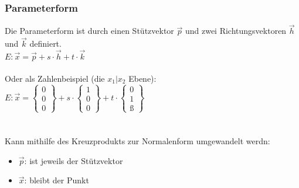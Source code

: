 
\subsubsection{Parameterform}
Die Parameterform ist durch einen Stützvektor $\vec{p}$ und zwei Richtungsvektoren $\vec{h}$ und $\vec{k}$ definiert. \\
$
E: \vec{x} = \vec{p} + s\cdot\vec{h} + t\cdot\vec{k}
$
\\\\
Oder als Zahlenbeispiel (die $x_1 | x_2$ Ebene): \\
$
E: \vec{x} = 
\begin{Bmatrix}
    0 \\ 0 \\ 0
\end{Bmatrix}
 + s \cdot
\begin{Bmatrix}
    1 \\ 0 \\ 0
\end{Bmatrix}
 + t \cdot 
 \begin{Bmatrix}
    0 \\ 1 \\ ß
 \end{Bmatrix}
$
\\\\\\
Kann mithilfe des Kreuzprodukts zur Normalenform umgewandelt werdn: \\
\begin{itemize}
    \item $\vec{p}$: ist jeweils der Stützvektor
    \item $\vec{x}$: bleibt der Punkt
\end{itemize}

